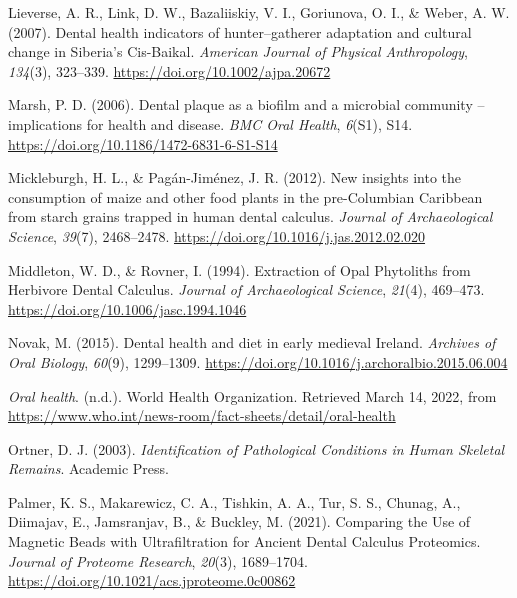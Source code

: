 \documentclass[
  letterpaper,
]{book}
\newlength{\cslhangindent}
\newlength{\cslentryspacingunit} %
\newenvironment{CSLReferences}[2] %
 {%
  \setlength{\parindent}{0pt}
  \ifodd #1
  \let\oldpar\par
  \def\par{\hangindent=\cslhangindent\oldpar}
  \fi
  \setlength{\parskip}{#2\cslentryspacingunit}
 }%
 {}
\begin{document}
\begin{CSLReferences}{1}{0}
\leavevmode{}%
Lieverse, A. R., Link, D. W., Bazaliiskiy, V. I., Goriunova, O. I., \&
Weber, A. W. (2007). Dental health indicators of hunter--gatherer
adaptation and cultural change in {Siberia}'s {Cis-Baikal}.
\emph{American Journal of Physical Anthropology}, \emph{134}(3),
323--339. \url{https://doi.org/10.1002/ajpa.20672}

\leavevmode{}%
Marsh, P. D. (2006). Dental plaque as a biofilm and a microbial
community -- implications for health and disease. \emph{BMC Oral
Health}, \emph{6}(S1), S14.
\url{https://doi.org/10.1186/1472-6831-6-S1-S14}

\leavevmode{}%
Mickleburgh, H. L., \& Pagán-Jiménez, J. R. (2012). New insights into
the consumption of maize and other food plants in the pre-{Columbian
Caribbean} from starch grains trapped in human dental calculus.
\emph{Journal of Archaeological Science}, \emph{39}(7), 2468--2478.
\url{https://doi.org/10.1016/j.jas.2012.02.020}

\leavevmode{}%
Middleton, W. D., \& Rovner, I. (1994). Extraction of {Opal Phytoliths}
from {Herbivore Dental Calculus}. \emph{Journal of Archaeological
Science}, \emph{21}(4), 469--473.
\url{https://doi.org/10.1006/jasc.1994.1046}

\leavevmode{}%
Novak, M. (2015). Dental health and diet in early medieval {Ireland}.
\emph{Archives of Oral Biology}, \emph{60}(9), 1299--1309.
\url{https://doi.org/10.1016/j.archoralbio.2015.06.004}

\leavevmode{}%
\emph{Oral health}. (n.d.). {World Health Organization}. Retrieved March
14, 2022, from
\url{https://www.who.int/news-room/fact-sheets/detail/oral-health}

\leavevmode{}%
Ortner, D. J. (2003). \emph{Identification of {Pathological Conditions}
in {Human Skeletal Remains}}. {Academic Press}.

\leavevmode{}%
Palmer, K. S., Makarewicz, C. A., Tishkin, A. A., Tur, S. S., Chunag,
A., Diimajav, E., Jamsranjav, B., \& Buckley, M. (2021). Comparing the
{Use} of {Magnetic Beads} with {Ultrafiltration} for {Ancient Dental
Calculus Proteomics}. \emph{Journal of Proteome Research}, \emph{20}(3),
1689--1704. \url{https://doi.org/10.1021/acs.jproteome.0c00862}


\end{CSLReferences}
\end{document}
